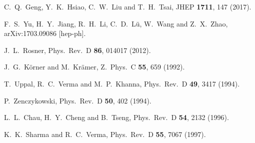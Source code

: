 
\begin{thebibliography}{99}

  C.~Q.~Geng, Y.~K.~Hsiao, C.~W.~Liu and T.~H.~Tsai,
  JHEP {\bf 1711}, 147 (2017).

  F.~S.~Yu, H.~Y.~Jiang, R.~H.~Li, C.~D.~L\"u, W.~Wang and Z.~X.~Zhao,
  arXiv:1703.09086 [hep-ph].

  
  J.~L.~Rosner,
  Phys.\ Rev.\ D {\bf 86}, 014017 (2012).
  

J.~G.~K\"orner and M.~Kr\"amer,
  Z.\ Phys.\ C {\bf 55}, 659 (1992).

T.~Uppal, R.~C.~Verma and M.~P.~Khanna,
  Phys.\ Rev.\ D {\bf 49}, 3417 (1994).


P.~Zenczykowski,
  Phys.\ Rev.\ D {\bf 50}, 402 (1994).

 L.~L.~Chau, H.~Y.~Cheng and B.~Tseng,
  Phys.\ Rev.\ D {\bf 54}, 2132 (1996).



K.~K.~Sharma and R.~C.~Verma,
  Phys.\ Rev.\ D {\bf 55}, 7067 (1997).



\end{thebibliography}
